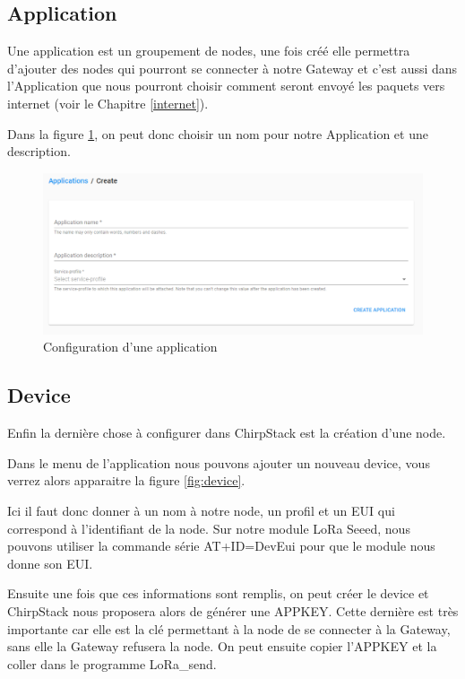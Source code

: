 \documentclass{article}
\begin{document}
		\subsection{Application}
			Une application est un groupement de nodes, une fois créé elle permettra d'ajouter des nodes qui pourront se connecter à notre Gateway et c'est aussi dans l'Application que nous pourront choisir comment seront envoyé les paquets vers internet (voir le Chapitre \ref{internet}).
			
			Dans la figure \ref{fig:application}, on peut donc choisir un nom pour notre Application et une description.
			
			\begin{figure}[H]
				\centering
				\includegraphics[width=0.7\linewidth]{application}
				\caption{Configuration d'une application}
				\label{fig:application}
			\end{figure}
			
		\subsection{Device}
			Enfin la dernière chose à configurer dans ChirpStack est la création d'une node.
			
			Dans le menu de l'application nous pouvons ajouter un nouveau device, vous verrez alors apparaitre la figure \ref{fig:device}.
			
			Ici il faut donc donner à un nom à notre node, un profil et un EUI qui correspond à l'identifiant de la node. Sur notre module LoRa Seeed, nous pouvons utiliser la commande série AT+ID=DevEui pour que le module nous donne son EUI.
			
			Ensuite une fois que ces informations sont remplis, on peut créer le device et ChirpStack nous proposera alors de générer une APPKEY. Cette dernière est très importante car elle est la clé permettant à la node de se connecter à la Gateway, sans elle la Gateway refusera la node. On peut ensuite copier l'APPKEY et la coller dans le programme LoRa\_send.
				
\end{document}
